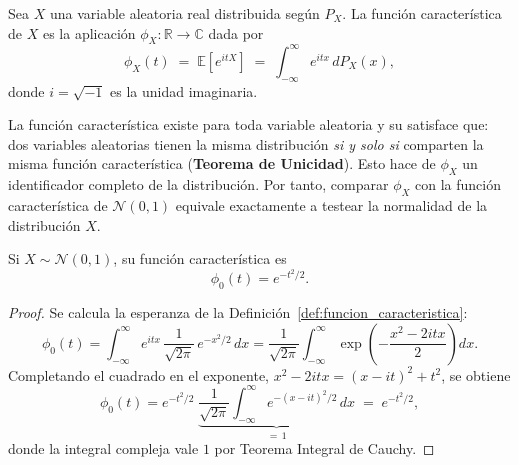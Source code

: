 \begin{definition}
\label{def:funcion_caracteristica}
Sea $X$ una variable aleatoria real distribuida según $P_X$. La función característica de $X$ es la aplicación $\phi_X : \mathbb{R} \to \mathbb{C}$ dada por
\begin{equation}
\phi_X(t) \;=\; \mathbb{E}\!\left[e^{itX}\right] \;=\; \int_{-\infty}^{\infty} e^{itx}\, dP_X(x),
\end{equation}
donde $i = \sqrt{-1}$ es la unidad imaginaria.
\end{definition}

La función característica existe para toda variable aleatoria y su  satisface que: dos variables aleatorias tienen la misma distribución \emph{si y solo si} comparten la misma función característica (\textbf{Teorema de Unicidad}). Esto hace de $\phi_X$ un identificador completo de la distribución. Por tanto, comparar $\phi_X$ con la función característica de $\mathcal{N}(0,1)$ equivale exactamente a testear la normalidad de la distribución $X$.

\begin{proposition}
\label{prop:cf_normal}
Si $X \sim \mathcal{N}(0,1)$, su función característica es
\begin{equation}
\phi_0(t) = e^{-t^2/2}.
\label{eq:cf_normal}
\end{equation}
\end{proposition}

\begin{proof}
Se calcula la esperanza de la Definición~\ref{def:funcion_caracteristica}:
\begin{equation*}
\phi_0(t) = \int_{-\infty}^{\infty} e^{itx}\, \frac{1}{\sqrt{2\pi}}\, e^{-x^2/2}\, dx = \frac{1}{\sqrt{2\pi}} \int_{-\infty}^{\infty} \exp\!\left(-\frac{x^2 - 2itx}{2}\right) dx.
\end{equation*}
Completando el cuadrado en el exponente, $x^2 - 2itx = (x - it)^2 + t^2$, se obtiene
\begin{equation*}
\phi_0(t) = e^{-t^2/2}\; \underbrace{\frac{1}{\sqrt{2\pi}} \int_{-\infty}^{\infty} e^{-(x-it)^2/2}\, dx}_{=\, 1} \;=\; e^{-t^2/2},
\end{equation*}
donde la integral compleja vale $1$ por Teorema Integral de Cauchy.
\end{proof}

